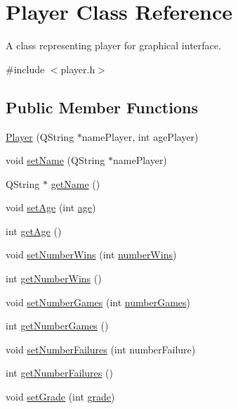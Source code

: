 \hypertarget{classPlayer}{}\section{Player Class Reference}
\label{classPlayer}


A class representing player for graphical interface.  




{\ttfamily \#include $<$player.\+h$>$}

\subsection*{Public Member Functions}
\begin{DoxyCompactItemize}
\item 
\hyperlink{classPlayer_aa862d30723707ac0ce1923d103a5033f}{Player} (Q\+String $\ast$name\+Player, int age\+Player)
\item 
void \hyperlink{classPlayer_a0c1485a5850d704d9b373ebe21cb9b21}{set\+Name} (Q\+String $\ast$name\+Player)
\item 
Q\+String $\ast$ \hyperlink{classPlayer_ae3585f991fe37695e2b1a5eba8cacac1}{get\+Name} ()
\item 
void \hyperlink{classPlayer_a23e901febda7a2f14791b3557c247df0}{set\+Age} (int \hyperlink{classPlayer_a91d98a856bbd96810b40af3ca5cc901a}{age})
\item 
int \hyperlink{classPlayer_a44a88871339022e9a268d613b55f39a1}{get\+Age} ()
\item 
void \hyperlink{classPlayer_a15e6f02e21348714fabfa32c176e2b4b}{set\+Number\+Wins} (int \hyperlink{classPlayer_a5490bb5e66c3e5ac702c7df4f363d57d}{number\+Wins})
\item 
int \hyperlink{classPlayer_ab4b4189b22c7952d961060550146a5e3}{get\+Number\+Wins} ()
\item 
void \hyperlink{classPlayer_aedf3ee71765e18407ad4ba30a8d25d4b}{set\+Number\+Games} (int \hyperlink{classPlayer_a1d6d057cd152c5d158546791cbd6bc8f}{number\+Games})
\item 
int \hyperlink{classPlayer_a1bcc25b1f0cb70eec57316d4bee68359}{get\+Number\+Games} ()
\item 
void \hyperlink{classPlayer_aaa363c802f56d43e77f1276b9851b5a5}{set\+Number\+Failures} (int number\+Failure)
\item 
int \hyperlink{classPlayer_a8b87716141c31266b5bb5ba5372b9b64}{get\+Number\+Failures} ()
\item 
void \hyperlink{classPlayer_a2a94b5f95dfbe0d2b19f925eec316a1d}{set\+Grade} (int \hyperlink{classPlayer_a13d4b9fff7f9b28844a348b444cff7be}{grade})

\end{DoxyCompactItemize}
